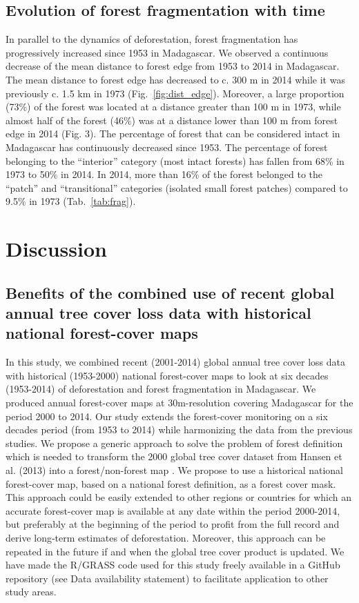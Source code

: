 \documentclass[a4paper, 12pt, leqno]{article} %
\begin{document}
\subsection{Evolution of forest fragmentation with time}

In parallel to the dynamics of deforestation, forest fragmentation has
progressively increased since 1953 in Madagascar. We observed a
continuous decrease of the mean distance to forest edge from 1953 to
2014 in Madagascar. The mean distance to forest edge has decreased to
c.  300 m in 2014 while it was previously c. 1.5 km in 1973
(Fig.~\ref{fig:dist_edge}).  Moreover, a large proportion (73\%) of
the forest was located at a distance greater than 100 m in 1973, while
almost half of the forest (46\%) was at a distance lower than 100 m
from forest edge in 2014 (Fig.  3). The percentage of forest that can
be considered intact in Madagascar has continuously decreased since
1953. The percentage of forest belonging to the ``interior'' category
(most intact forests) has fallen from 68\% in 1973 to 50\% in 2014. In
2014, more than 16\% of the forest belonged to the ``patch'' and
``transitional'' categories (isolated small forest patches) compared
to 9.5\% in 1973 (Tab.~\ref{tab:frag}).

\section{Discussion}
\label{discussion}

\subsection{Benefits of the combined use of recent global annual
  tree cover loss data with historical national forest-cover maps}

In this study, we combined recent (2001-2014) global annual tree cover
loss data \citep{Hansen2013} with historical (1953-2000) national
forest-cover maps \citep{Harper2007} to look at six decades (1953-2014)
of deforestation and forest fragmentation in Madagascar. We produced
annual forest-cover maps at 30m-resolution covering Madagascar for the
period 2000 to 2014. Our study extends the forest-cover monitoring on a
six decades period (from 1953 to 2014) while harmonizing the data from
the previous studies. We propose a generic approach to solve the problem
of forest definition which is needed to transform the 2000 global tree
cover dataset from Hansen et al. (2013) into a forest/non-forest map
\citep{Tropek2014}. We propose to use a historical national forest-cover
map, based on a national forest definition, as a forest cover mask. This
approach could be easily extended to other regions or countries for
which an accurate forest-cover map is available at any date within the
period 2000-2014, but preferably at the beginning of the period to
profit from the full record and derive long-term estimates of
deforestation. Moreover, this approach can be repeated in the future if
and when the global tree cover product is updated. We have made the
R/GRASS code used for this study freely available in a GitHub repository
(see Data availability statement) to facilitate application to other
study areas.
\end{document}
